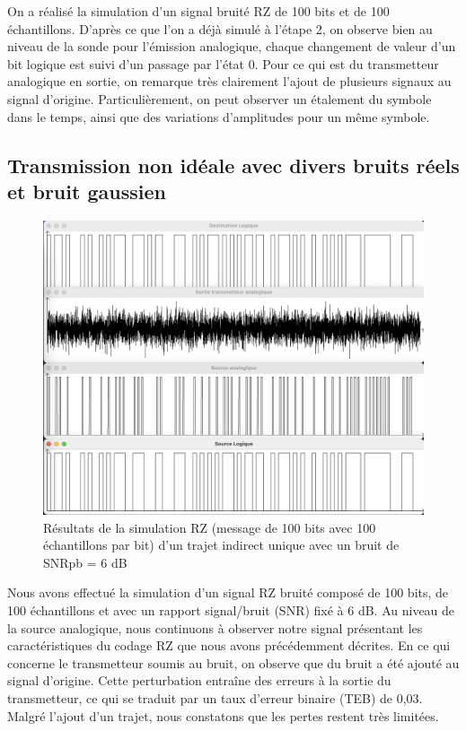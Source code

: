 On a réalisé la simulation d'un signal bruité RZ de 100 bits et de 100 échantillons. D'après ce que l'on a déjà simulé à l'étape 2, on observe bien au niveau de la sonde pour l'émission analogique, chaque changement de valeur d'un bit logique est suivi d'un passage par l'état 0. Pour ce qui est du transmetteur analogique en sortie, on remarque très clairement l'ajout de plusieurs signaux au signal d'origine. Particulièrement, on peut observer un étalement du symbole dans le temps, ainsi que des variations d'amplitudes pour un même symbole.


\subsection{Transmission non idéale avec divers bruits réels et bruit gaussien}

\begin{figure}[H]
    \centering
    \includegraphics[width=\textwidth]{img/etape4b_ti_seul_et_bruit_6_RZ.png}
    \caption{Résultats de la simulation RZ (message de 100 bits avec 100 échantillons par bit) d'un trajet indirect unique avec un bruit de SNRpb = 6 dB}
    \label{fig:etape4b_ti_seul_et_bruit_6_RZ}
\end{figure}

Nous avons effectué la simulation d'un signal RZ bruité composé de 100 bits, de 100 échantillons et avec un rapport signal/bruit (SNR) fixé à 6 dB. Au niveau de la source analogique, nous continuons à observer notre signal présentant les caractéristiques du codage RZ que nous avons précédemment décrites. En ce qui concerne le transmetteur soumis au bruit, on observe que du bruit a été ajouté au signal d'origine. Cette perturbation entraîne des erreurs à la sortie du transmetteur, ce qui se traduit par un taux d'erreur binaire (TEB) de 0,03. Malgré l'ajout d'un trajet, nous constatons que les pertes restent très limitées.


